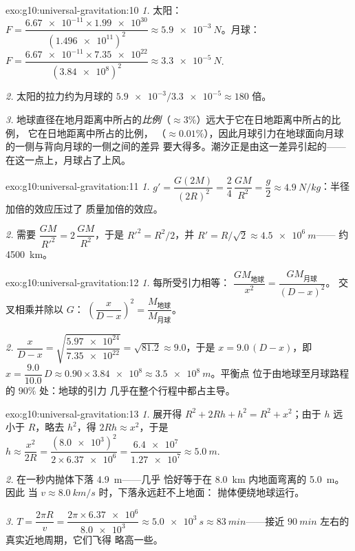\begin{solution}{exo:g10:universal-gravitation:10}
\emph{1.} 太阳：
$F = \dfrac{\num{6.67e-11} \times \num{1.99e30}}{(\num{1.496e11})^2}
\approx \qty{5.9e-3}{N}$。月球：
$F = \dfrac{\num{6.67e-11} \times \num{7.35e22}}{(\num{3.84e8})^2}
\approx \qty{3.3e-5}{N}$.

\emph{2.} 太阳的拉力约为月球的
$\num{5.9e-3}/\num{3.3e-5} \approx 180$ 倍。

\emph{3.} 地球直径在地月距离中所占的\emph{比例}（$\approx 3\%$）远大于它在日地距离中所占的比例，
它在日地距离中所占的比例，
（$\approx 0.01\%$），因此月球引力在地球面向月球的一侧与背向月球的一侧之间的差异
要大得多。潮汐正是由这一差异引起的——
在这一点上，月球占了上风。
\end{solution}

\begin{solution}{exo:g10:universal-gravitation:11}
\emph{1.} $g' = \dfrac{G (2M)}{(2R)^2} = \dfrac{2}{4}\,\dfrac{GM}{R^2}
= \dfrac{g}{2} \approx \qty{4.9}{N/kg}$：半径加倍的效应压过了
质量加倍的效应。

\emph{2.} 需要 $\dfrac{GM}{R'^2} = 2\,\dfrac{GM}{R^2}$，于是
$R'^2 = R^2/2$，并 $R' = R/\sqrt{2} \approx \qty{4.5e6}{m}$——
约 \qty{4500}{km}。
\end{solution}

\begin{solution}{exo:g10:universal-gravitation:12}
\emph{1.} 每所受引力相等：
$\dfrac{G M_{\text{地球}}}{x^2} = \dfrac{G M_{\text{月球}}}{(D-x)^2}$。
交叉相乘并除以 $G$：
$\left(\dfrac{x}{D-x}\right)^2 = \dfrac{M_{\text{地球}}}{M_{\text{月球}}}$。

\emph{2.} $\dfrac{x}{D-x}
= \sqrt{\dfrac{\num{5.97e24}}{\num{7.35e22}}} = \sqrt{81.2} \approx
9.0$，于是 $x = 9.0\,(D - x)$，即 $x = \dfrac{9.0}{10.0}\,D
\approx 0.90 \times \num{3.84e8} \approx \qty{3.5e8}{m}$。平衡点
位于由地球至月球路程的 $90\%$ 处：地球的引力
几乎在整个行程中都占主导。
\end{solution}

\begin{solution}{exo:g10:universal-gravitation:13}
\emph{1.} 展开得 $R^2 + 2Rh + h^2 = R^2 + x^2$；由于 $h$ 远小于
$R$，略去 $h^2$，得 $2Rh \approx x^2$，于是
$h \approx \dfrac{x^2}{2R}
= \dfrac{(\num{8.0e3})^2}{2 \times \num{6.37e6}}
= \dfrac{\num{6.4e7}}{\num{1.27e7}} \approx \qty{5.0}{m}$.

\emph{2.} 在一秒内抛体下落 \qty{4.9}{m}——几乎
恰好等于在 \qty{8.0}{km} 内地面弯离的 \qty{5.0}{m}。因此
当 $v \approx \qty{8.0}{km/s}$ 时，下落永远赶不上地面：
抛体便绕地球运行。

\emph{3.} $T = \dfrac{2\pi R}{v}
= \dfrac{2\pi \times \num{6.37e6}}{\num{8.0e3}}
\approx \qty{5.0e3}{s} \approx \qty{83}{min}$——接近
$\qty{90}{min}$ 左右的真实近地周期，它们飞得
略高一些。
\end{solution}

